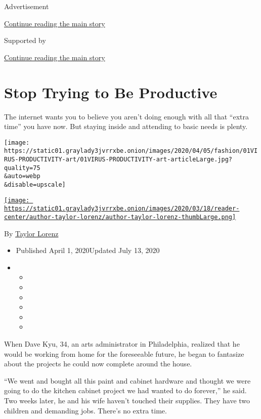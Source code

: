 Advertisement

\protect\hyperlink{after-top}{Continue reading the main story}

Supported by

\protect\hyperlink{after-sponsor}{Continue reading the main story}

\hypertarget{stop-trying-to-be-productive}{%
\section{Stop Trying to Be
Productive}\label{stop-trying-to-be-productive}}

The internet wants you to believe you aren't doing enough with all that
``extra time'' you have now. But staying inside and attending to basic
needs is plenty.

\texttt{[image: https://static01.graylady3jvrrxbe.onion/images/2020/04/05/fashion/01VIRUS-PRODUCTIVITY-art/01VIRUS-PRODUCTIVITY-art-articleLarge.jpg?quality=75\\\&auto=webp\\\&disable=upscale]}

\href{https://www.nytimes3xbfgragh.onion/by/taylor-lorenz}{\texttt{[image: https://static01.graylady3jvrrxbe.onion/images/2020/03/18/reader-center/author-taylor-lorenz/author-taylor-lorenz-thumbLarge.png]}}

By \href{https://www.nytimes3xbfgragh.onion/by/taylor-lorenz}{Taylor
Lorenz}

\begin{itemize}
\item
  Published April 1, 2020Updated July 13, 2020
\item
  \begin{itemize}
  \item
  \item
  \item
  \item
  \item
  \item
  \end{itemize}
\end{itemize}

When Dave Kyu, 34, an arts administrator in Philadelphia, realized that
he would be working from home for the foreseeable future, he began to
fantasize about the projects he could now complete around the house.

``We went and bought all this paint and cabinet hardware and thought we
were going to do the kitchen cabinet project we had wanted to do
forever,'' he said. Two weeks later, he and his wife haven't touched
their supplies. They have two children and demanding jobs. There's no
extra time.

